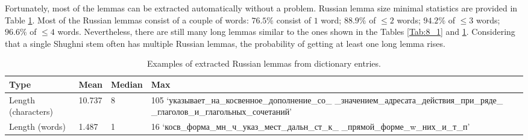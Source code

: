 Fortunately, most of the lemmas can be extracted automatically without a problem. Russian lemma size minimal statistics are provided in Table \ref{Tab:8_2}. Most of the Russian lemmas consist of a couple of words: $76.5\%$ consist of $1$ word; $88.9\%$ of $\leq 2$ words; $94.2\%$ of $\leq 3$ words; $96.6\%$ of $\leq 4$ words. Nevertheless, there are still many long lemmas similar to the ones shown in the Tables \ref{Tab:8_1} and \ref{Tab:8_2}. Considering that a single Shughni stem often has multiple Russian lemmas, the probability of getting at least one long lemma rises.

\begin{table}[!htbp]
    \begin{center}
        \begin{tabular}{|p{3cm}|p{1.5cm}|p{1.5cm}|p{8.5cm}|}
            \hline
            \textbf{Type} & \textbf{Mean} & \textbf{Median} & \textbf{Max} \\
            \hline
            \hline
            Length (characters) & 10.737 & 8 & 105 `указывает\_на\_косвенное\_дополнение\_со\_ \_значением\_адресата\_действия\_при\_ряде\_ \_глаголов\_и\_глагольных\_сочетаний' \\
            \hline
            Length (words) & 1.487 & 1 & 16 `косв\_форма\_мн\_ч\_указ\_мест\_дальн\_ст\_к\_ \_прямой\_форме\_w\_них\_и\_т\_п' \\
            \hline
        \end{tabular}
        \caption{Examples of extracted Russian lemmas from dictionary entries.}
        \label{Tab:8_2}
    \end{center}
\end{table}
